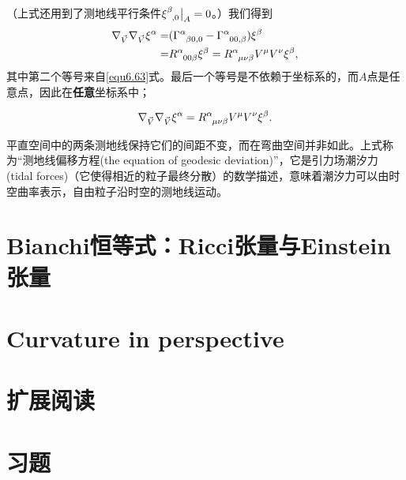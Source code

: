（上式还用到了测地线平行条件$\xi\indices{^\beta_{, 0}} \big|_{A} = 0$。）我们得到
\begin{align}
    \nabla_{\vec{V}} \nabla_{\vec{V}}  \xi^\alpha =& (\Gamma\indices{^\alpha_{\beta 0, 0}} - \Gamma\indices{^\alpha_{00, \beta}}) \xi^\beta \notag \\
    =& R\indices{^\alpha_{00 \beta}} \xi^\beta = R\indices{^\alpha_{\mu \nu \beta}} V^\mu V^\nu \xi^\beta, \label{equ6.86}
\end{align}
其中第二个等号来自\eqref{equ6.63}式。最后一个等号是不依赖于坐标系的，而$A$点是任意点，因此在\textbf{任意}坐标系中；
\begin{shaded}
\begin{equation}
    \nabla_{\vec{V}} \nabla_{\vec{V}} \xi^\alpha = R\indices{^\alpha_{\mu \nu \beta}} V^\mu V^\nu \xi^\beta.
\label{equ6.87}
\end{equation}
\end{shaded}
平直空间中的两条测地线保持它们的间距不变，而在弯曲空间并非如此。上式称为“测地线偏移方程(the equation of geodesic deviation)”，它是引力场潮汐力(tidal forces)（它使得相近的粒子最终分散）的数学描述，意味着潮汐力可以由时空曲率表示，自由粒子沿时空的测地线运动。



\section{Bianchi恒等式：Ricci张量与Einstein张量}
\label{sec6.6}

\section{Curvature in perspective}
\label{sec6.7}

\section{扩展阅读}
\label{sec6.8}

\section{习题}
\label{sec6.9}